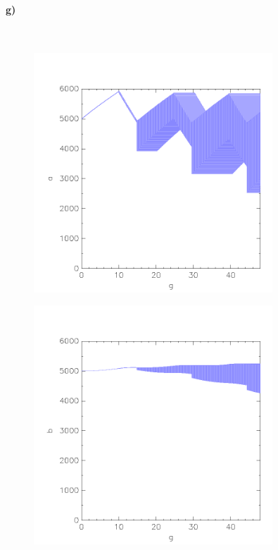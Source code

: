 \paragraph{g)}\mbox{} \\
\begin{minipage}[t]{0.5\textwidth} 
	\begin{figure}[H]
		\centering
		\includegraphics[width=0.8\textwidth]{Aufgabe_g1).png}
	\end{figure}
\end{minipage}
\hfill
\begin{minipage}[t]{0.5\textwidth} 
	\begin{figure}[H]
		\centering
		\includegraphics[width=0.8\textwidth]{Aufgabe_g2).png}
	\end{figure}
\end{minipage}

